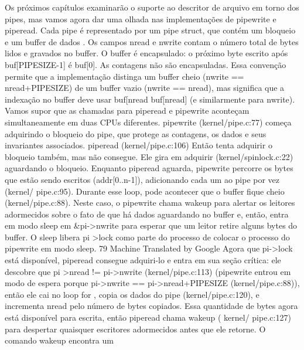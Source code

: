  Os  próximos  capítulos  examinarão  o  suporte  ao  descritor  de  arquivo  em  torno  dos  pipes,  mas  vamos  agora  dar  
uma  olhada  nas  implementações  de  pipewrite  e  piperead.
 Cada  pipe  é  representado  por  um  pipe  struct,  que  contém  um  bloqueio  e  um  buffer  de  dados .
 Os  campos  nread  e  nwrite  contam  o  número  total  de  bytes  lidos  e  gravados  no  buffer.  O  buffer  é  encapsulado:  o  
próximo  byte  escrito  após  buf[PIPESIZE-1]  é  buf[0].  As  contagens  não  são  encapsuladas.  Essa  convenção  
permite  que  a  implementação  distinga  um  buffer  cheio  (nwrite  ==  nread+PIPESIZE)  de  um  buffer  vazio  (nwrite  
==  nread),  mas  significa  que  a  indexação  no  buffer  deve  usar  buf[nread  %
buf[nread]  (e  similarmente  para  nwrite).
 Vamos  supor  que  as  chamadas  para  piperead  e  pipewrite  aconteçam  simultaneamente  em  duas  CPUs  
diferentes.  pipewrite  (kernel/pipe.c:77)  começa  adquirindo  o  bloqueio  do  pipe,  que  protege  as  contagens,  os  
dados  e  seus  invariantes  associados.  piperead  (kernel/pipe.c:106)  Então  tenta  adquirir  o  bloqueio  também,  mas  
não  consegue.  Ele  gira  em  adquirir  (kernel/spinlock.c:22)  aguardando  o  bloqueio.  Enquanto  piperead  aguarda,  
pipewrite  percorre  os  bytes  que  estão  sendo  escritos  (addr[0..n-1]),  adicionando  cada  um  ao  pipe  por  vez  (kernel/
 pipe.c:95).  Durante  esse  loop,  pode  acontecer  que  o  buffer  fique  cheio  (kernel/pipe.c:88).  Neste  caso,  o  pipewrite  
chama  wakeup  para  alertar  os  leitores  adormecidos  sobre  o  fato  de  que  há  dados  aguardando  no  buffer  e,  então,  
entra  em  modo  sleep  em  &pi->nwrite  para  esperar  que  um  leitor  retire  alguns  bytes  do  buffer.  O  sleep  libera  pi
>lock  como  parte  do  processo  de  colocar  o  processo  do  pipewrite  em  modo  sleep.
 79
Machine Translated by Google
 Agora  que  pi->lock  está  disponível,  piperead  consegue  adquiri-lo  e  entra  em  sua  seção  crítica:  ele  descobre  que  pi
>nread !=  pi->nwrite  (kernel/pipe.c:113)  (pipewrite  entrou  em  modo  de  espera  porque  pi->nwrite  ==  pi->nread+PIPESIZE  
(kernel/pipe.c:88)),  então  ele  cai  no  loop  for ,  copia  os  dados  do  pipe  (kernel/pipe.c:120),  e  incrementa  nread  pelo  número  
de  bytes  copiados.  Essa  quantidade  de  bytes  agora  está  disponível  para  escrita,  então  piperead  chama  wakeup  ( kernel/
 pipe.c:127)  para  despertar  quaisquer  escritores  adormecidos  antes  que  ele  retorne.  O  comando  wakeup  encontra  um  
